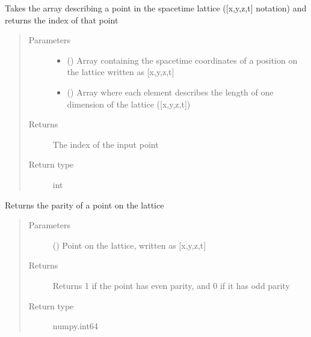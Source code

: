 \documentclass[letterpaper,10pt,english]{sphinxmanual}
\begin{document}
\begin{fulllineitems}
\label{\detokenize{index:su2.p2i}}
Takes the array describing a point in the spacetime lattice
({[}x,y,z,t{]} notation) and returns the index of that point
\begin{quote}\begin{description}
\item[{Parameters}] \leavevmode\begin{itemize}
\item {} 
 () \textendash{} Array containing the spacetime coordinates of a position on
the lattice written as {[}x,y,z,t{]}

\item {} 
 () \textendash{} Array where each element describes the length of one
dimension of the lattice ({[}x,y,z,t{]})

\end{itemize}

\item[{Returns}] \leavevmode
The index of the input point

\item[{Return type}] \leavevmode
int

\end{description}\end{quote}

\end{fulllineitems}


\begin{fulllineitems}
\label{\detokenize{index:su2.parity}}
Returns the parity of a point on the lattice
\begin{quote}\begin{description}
\item[{Parameters}] \leavevmode
{} () \textendash{} Point on the lattice, written as {[}x,y,z,t{]}

\item[{Returns}] \leavevmode
Returns 1 if the point has even parity, and 0 if it has odd
parity

\item[{Return type}] \leavevmode
numpy.int64

\end{description}\end{quote}

\end{fulllineitems}
\end{document}
